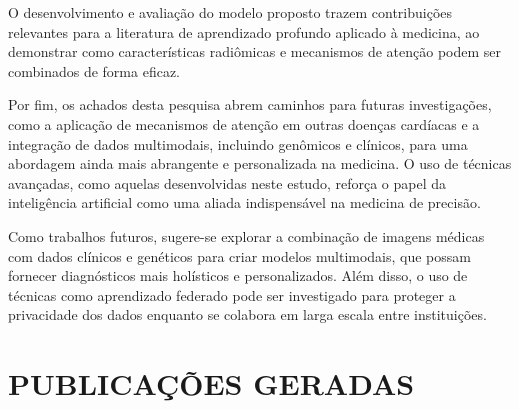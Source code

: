 O desenvolvimento e avaliação do modelo proposto trazem contribuições relevantes para a literatura de aprendizado profundo aplicado à medicina, ao demonstrar como características radiômicas e mecanismos de atenção podem ser combinados de forma eficaz. 

Por fim, os achados desta pesquisa abrem caminhos para futuras investigações, como a aplicação de mecanismos de atenção em outras doenças cardíacas e a integração de dados multimodais, incluindo genômicos e clínicos, para uma abordagem ainda mais abrangente e personalizada na medicina. O uso de técnicas avançadas, como aquelas desenvolvidas neste estudo, reforça o papel da inteligência artificial como uma aliada indispensável na medicina de precisão.

Como trabalhos futuros, sugere-se explorar a combinação de imagens médicas com dados clínicos e genéticos para criar modelos multimodais, que possam fornecer diagnósticos mais holísticos e personalizados. Além disso, o uso de técnicas como aprendizado federado pode ser investigado para proteger a privacidade dos dados enquanto se colabora em larga escala entre instituições.

\section{PUBLICAÇÕES GERADAS} 
\label{sec:cap7_publicacoes}

\lipsum[1-1]